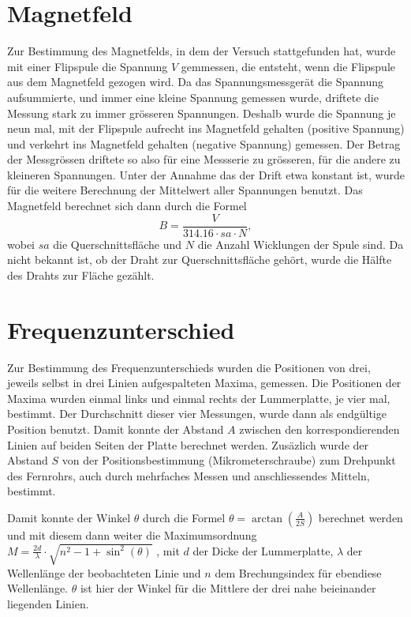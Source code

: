 \documentclass[a4paper,parskip,11pt, DIV12]{scrreprt}
\begin{document}
	\section{Magnetfeld}
	
	Zur Bestimmung des Magnetfelds, in dem der Versuch stattgefunden hat, wurde mit einer Flipspule die Spannung $V$ gemmessen, die entsteht, wenn die Flipspule aus dem Magnetfeld gezogen wird. Da das Spannungsmessgerät die Spannung aufsummierte, und immer eine kleine Spannung gemessen wurde, driftete die Messung stark zu immer grösseren Spannungen. Deshalb wurde die Spannung je neun mal, mit der Flipspule aufrecht ins Magnetfeld gehalten (positive Spannung) und verkehrt ins Magnetfeld gehalten (negative Spannung) gemessen. Der Betrag der Messgrössen driftete so also für eine Messserie zu grösseren, für die andere zu kleineren Spannungen. Unter der Annahme das der Drift etwa konstant ist, wurde für die weitere Berechnung der Mittelwert aller Spannungen benutzt.   
	Das Magnetfeld berechnet sich dann durch die Formel
	\begin{equation}
	\label{B-Feld}
	B = \frac{V}{314.16 \cdot sa \cdot N} ,
	\end{equation}
	wobei $sa$ die Querschnittsfläche und $N$ die Anzahl Wicklungen der Spule sind. Da nicht bekannt ist, ob der Draht zur Querschnittsfläche gehört, wurde die Hälfte des Drahts zur Fläche gezählt. 
	
	\section{Frequenzunterschied}
	
	Zur Bestimmung des Frequenzunterschieds wurden die Positionen von drei, jeweils selbst in drei Linien aufgespalteten Maxima, gemessen. Die Positionen der Maxima wurden einmal links und einmal rechts der Lummerplatte, je vier mal, bestimmt. Der Durchschnitt dieser vier Messungen, wurde dann als endgültige Position benutzt. Damit konnte der Abstand $A$ zwischen den korrespondierenden Linien auf beiden Seiten der Platte berechnet werden. Zusäzlich wurde der Abstand $S$ von der Positionsbestimmung (Mikrometerschraube) zum Drehpunkt des Fernrohrs, auch durch mehrfaches Messen und anschliessendes Mitteln, bestimmt. 

Damit konnte der Winkel $\theta$ durch die Formel $\theta = \arctan(\frac{A}{2 S})$ berechnet werden und mit diesem dann weiter die Maximumsordnung  $M = \frac{2d}{\lambda} \cdot \sqrt{n^2-1+\sin^2(\theta)}$ , mit $d$ der Dicke der Lummerplatte, $\lambda$ der Wellenlänge der beobachteten Linie und $n$ dem Brechungsindex für ebendiese Wellenlänge. $\theta$ ist hier der Winkel für die Mittlere der drei nahe beieinander liegenden Linien. 
\end{document}
